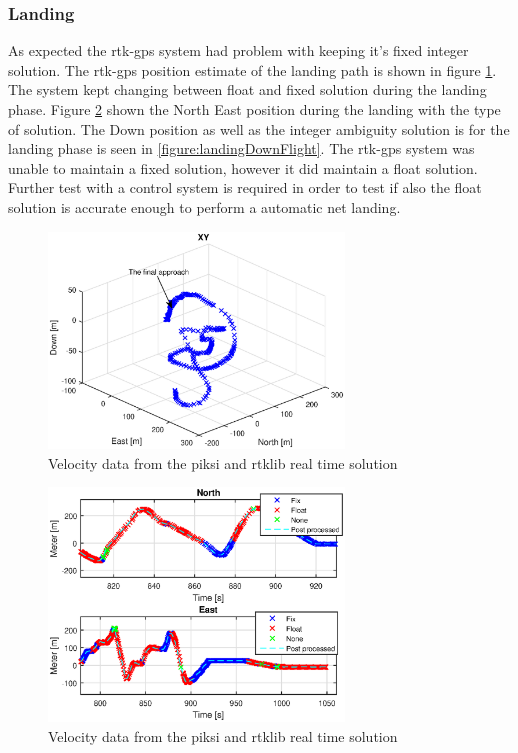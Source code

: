 \subsubsection{Landing}
As expected the \gls{rtk-gps} system had problem with keeping it's fixed integer solution. The \gls{rtk-gps} position estimate of the landing path is shown in figure \ref{figure:landingNEDFlight}. The system kept changing between float and fixed solution during the landing phase. Figure \ref{figure:landingNorthEastFlight} shown the North East position during the landing with the type of solution. The Down position as well as the integer ambiguity solution is for the landing phase is seen in \ref{figure:landingDownFlight}. The \gls{rtk-gps} system was unable to maintain a fixed solution, however it did maintain a float solution. Further test with a control system is required in order to test if also the float solution is accurate enough to perform a automatic net landing.
\begin{figure}[H]
	\centering
		\includegraphics[width=0.7\textwidth]{figs/plots/landingNedFlight.eps}
		\caption{Velocity data from the piksi and rtklib real time solution}
		\label{figure:landingNEDFlight}
\end{figure}
\begin{figure}[H]
	\centering
		\includegraphics[width=0.7\textwidth]{figs/plots/landingNorthEastFlight.eps}
		\caption{Velocity data from the piksi and rtklib real time solution}
		\label{figure:landingNorthEastFlight}
\end{figure}
